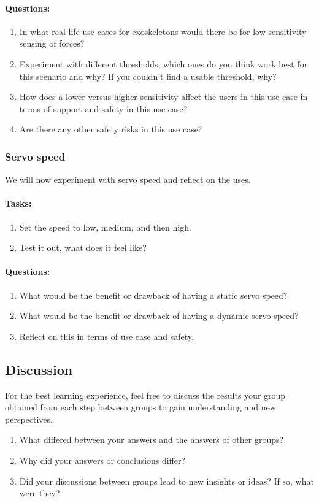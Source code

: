 \paragraph{Questions:} 
\begin{enumerate}[]
	\item In what real-life use cases for exoskeletons would there be for low-sensitivity sensing of forces? 
	\item Experiment with different thresholds, which ones do you think work best for this scenario and why? If you couldn’t find a usable threshold, why? 
	\item How does a lower versus higher sensitivity affect the users in this use case in terms of support and safety in this use case?
	\item Are there any other safety risks in this use case?
\end{enumerate}

\subsubsection{Servo speed}
We will now experiment with servo speed and reflect on the uses. 

\paragraph{Tasks:}
\begin{enumerate}[]
	\item Set the speed to low, medium, and then high.
	\item 	Test it out, what does it feel like?
\end{enumerate}

	
\paragraph{Questions:} 
\begin{enumerate}[]
	\item What would be the benefit or drawback of having a static servo speed? 
	\item What would be the benefit or drawback of having a dynamic servo speed? 
	\item Reflect on this in terms of use case and safety. 
\end{enumerate} 	

\subsection{Discussion}
For the best learning experience, feel free to discuss the results your group obtained from each step between groups to gain understanding and new perspectives.
\begin{enumerate}[]
	\item What differed between your answers and the answers of other groups?
	\item Why did your answers or conclusions differ?
	\item Did your discussions between groups lead to new insights or ideas? If so, what were they?
\end{enumerate} 	


